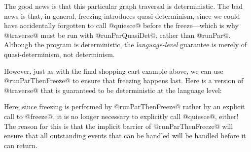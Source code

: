 The good news is that this particular graph traversal is
deterministic.  The bad news is that, in general, freezing introduces
quasi-determinism, since we could have accidentally forgotten to call
@quiesce@ before the freeze---which is why @traverse@ must be run with
@runParQuasiDet@, rather than @runPar@.  Although the program is
deterministic, the \emph{language-level} guarantee is merely of
quasi-determinism, not determinism.

However, just as with the final shopping cart example above, we can
use @runParThenFreeze@ to ensure that freezing happens last.  Here is
a version of @traverse@ that is guaranteed to be deterministic at the
language level:

\singlespacing

\doublespacing

Here, since freezing is performed by @runParThenFreeze@ rather by an
explicit call to @freeze@, it is no longer necessary to explicitly
call @quiesce@, either!  The reason for this is that the implicit
barrier of @runParThenFreeze@ will ensure that all outstanding events
that can be handled will be handled before it can return.
